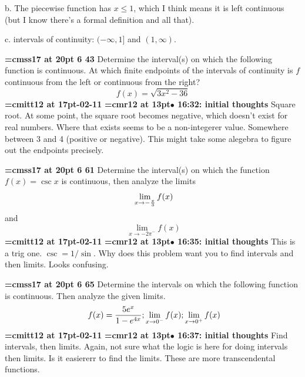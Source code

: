 b. The piecewise function has  $x \le 1$, which I think means it is left continuous (but I know there's a formal definition and all that).
\par

c. intervals of continuity: $(-\infty, 1]$ and $(1, \infty)$.
\par

{\medskip\noindent\bf\font\titlefont=cmss17 at 20pt 6 43}\medskip
Determine the interval(s) on which the following function
is continuous. At which finite endpoints of the intervals
of continuity is $f$ continuous from the left or continuous
from the right?
$$f(x) = \sqrt{3x^2 - 36}$$
{\medskip\noindent\bf\font\titlefont=cmitt12 at 17pt-02-11}\medskip
{\smallskip\noindent\bf\font\titlefont=cmr12 at 13pt\titlefont $\bullet$ 16:32: initial thoughts}\smallskip
Square root. At some point, the square root becomes negative, which doesn't exist for real numbers. Where that exists seems to be a non-integerer value. Somewhere between 3 and 4 (positive or negative). This might take some alegebra to figure out the endpoints precisely.
\par

{\medskip\noindent\bf\font\titlefont=cmss17 at 20pt 6 61}\medskip
Determine the interval(s) on which the function
$f(x) = \csc x$
is continuous, then analyze the limits
$$\
\lim_{x \to -{\pi \over 3}}{f(x)}
$$
and
$$\
\lim_{x \to -{2\pi}^{-}}{f(x)}
$$
{\medskip\noindent\bf\font\titlefont=cmitt12 at 17pt-02-11}\medskip
{\smallskip\noindent\bf\font\titlefont=cmr12 at 13pt\titlefont $\bullet$ 16:35: initial thoughts}\smallskip
This is a trig one. $\csc = 1/\sin$. Why does this problem want you to find intervals and then limits. Looks confusing.
\par

{\medskip\noindent\bf\font\titlefont=cmss17 at 20pt 6 65}\medskip
Determine the intervals on which the following function
is continuous. Then analyze the given limits.
$$\
f(x) = {
5e^x
\over
1 - e^{4x}
};
\lim_{x \to 0^{-}}{f(x)};
\lim_{x \to 0^{+}}{f(x)}
$$
{\medskip\noindent\bf\font\titlefont=cmitt12 at 17pt-02-11}\medskip
{\smallskip\noindent\bf\font\titlefont=cmr12 at 13pt\titlefont $\bullet$ 16:37: initial thoughts}\smallskip
Find intervals, then limits. Again, not sure what the logic is here for doing intervals then limits. Is it easiererr to find the limits. These are more transcendental functions.
\par

